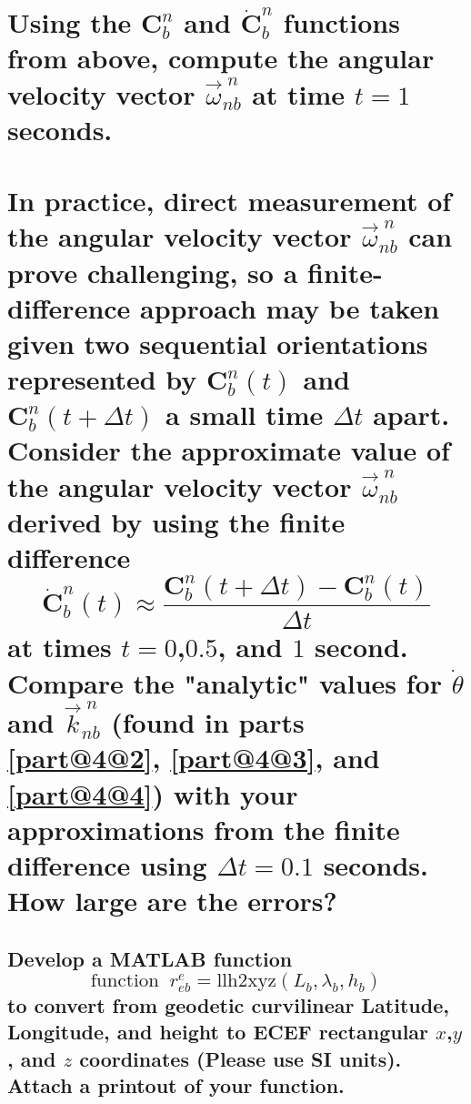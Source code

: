 \documentclass[12pt,letterpaper, onecolumn]{exam}
\begin{document}
\begin{questions}
\begin{parts}
\begin{subparts}
        \end{subparts}
        \part{Using the $\mathbf{C}^n_b$ and $\dot{\mathbf{C}}^n_b$ functions from above, compute the angular velocity vector $\vec{\omega}^{\;n}_{nb}$ at time $t = 1$ seconds.}
        \begin{subparts}

        \end{subparts}

        \part{In practice, direct measurement of the angular velocity vector $\vec{\omega}^{\;n}_{nb}$ can prove challenging, so a finite-difference approach may be taken given two sequential orientations represented by $\mathbf{C}^n_b(t)$ and $\mathbf{C}^n_b(t + \Delta t)$ a small time $\Delta t$ apart. Consider the approximate value of the angular velocity vector $\vec{\omega}^{\;n}_{nb}$ derived by using the finite difference
            \[\dot{\mathbf{C}}^n_b(t) \approx \frac{\mathbf{C}^n_b(t + \Delta t) - \mathbf{C}^n_b(t)}{\Delta t} \]
            at times $t = 0$,$0.5$, and $1$ second. Compare the "analytic" values for $\dot{\theta}$ and $\vec{k}^{\;n}_{nb}$ (found in parts \ref{part@4@2}, \ref{part@4@3}, and \ref{part@4@4}) with your approximations from the finite difference using $\Delta t = 0.1$ seconds. How large are the errors?}
    \end{parts}
    \clearpage
    \begin{parts}
        \part{Develop a MATLAB function \[\text{function}\;\; r^e_{eb} = \text{llh2xyz}(L_b,\lambda_b,h_b) \]
        to convert from geodetic curvilinear Latitude, Longitude, and height to ECEF rectangular $x$,$y$, and $z$ coordinates (Please use SI units). Attach a printout of your function.}
        \begin{subparts}
        \end{subparts}


\end{parts}
\end{questions}
\end{document}
